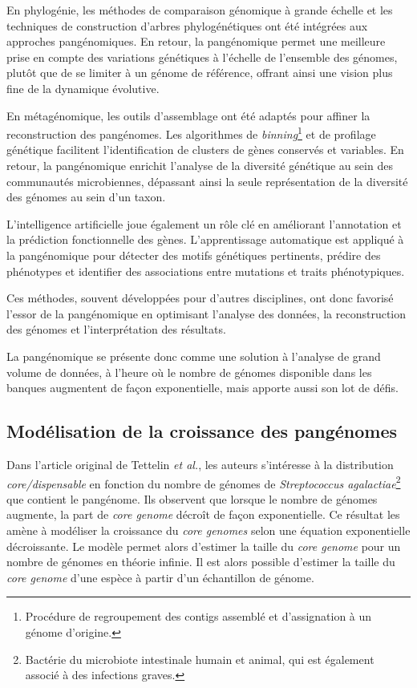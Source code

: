 En phylogénie, les méthodes de comparaison génomique à grande échelle et les techniques de construction d'arbres phylogénétiques ont été intégrées aux approches pangénomiques. En retour, la pangénomique permet une meilleure prise en compte des variations génétiques à l'échelle de l'ensemble des génomes, plutôt que de se limiter à un génome de référence, offrant ainsi une vision plus fine de la dynamique évolutive.

En métagénomique, les outils d’assemblage ont été adaptés pour affiner la reconstruction des pangénomes. Les algorithmes de \textit{binning}\footnote{Procédure de regroupement des contigs assemblé et d'assignation à un génome d'origine.} et de profilage génétique facilitent l’identification de clusters de gènes conservés et variables. En retour, la pangénomique enrichit l’analyse de la diversité génétique au sein des communautés microbiennes, dépassant ainsi la seule représentation de la diversité des génomes au sein d’un taxon.

L’intelligence artificielle joue également un rôle clé en améliorant l’annotation et la prédiction fonctionnelle des gènes. L’apprentissage automatique est appliqué à la pangénomique pour détecter des motifs génétiques pertinents, prédire des phénotypes et identifier des associations entre mutations et traits phénotypiques.

Ces méthodes, souvent développées pour d’autres disciplines, ont donc favorisé l’essor de la pangénomique en optimisant l’analyse des données, la reconstruction des génomes et l’interprétation des résultats.

La pangénomique se présente donc comme une solution à l'analyse de grand volume de données, à l'heure où le nombre de génomes disponible dans les banques augmentent de façon exponentielle, mais apporte aussi son lot de défis.

\subsection{Modélisation de la croissance des pangénomes}
\label{sec:croissance_pan}

Dans l'article original de Tettelin \textit{et al.}, les auteurs s'intéresse à la distribution \textit{core/dispensable} en fonction du nombre de génomes de \textit{Streptococcus agalactiae}\footnote{Bactérie du microbiote intestinale humain et animal, qui est également associé à des infections graves.} que contient le pangénome. Ils observent que lorsque le nombre de génomes augmente, la part de \textit{core genome} décroît de façon exponentielle. Ce résultat les amène à modéliser la croissance du \textit{core genomes} selon une équation exponentielle décroissante. Le modèle permet alors d'estimer la taille du \textit{core genome} pour un nombre de génomes en théorie infinie. Il est alors possible d'estimer la taille du \textit{core genome} d'une espèce à partir d'un échantillon de génome. 

